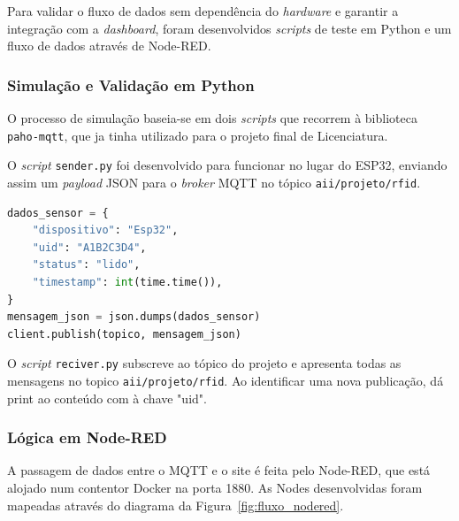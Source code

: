 \documentclass[a4paper,12pt]{article}
\begin{document}
Para validar o fluxo de dados sem dependência do \textit{hardware} e garantir a integração com a \textit{dashboard}, foram desenvolvidos \textit{scripts} de teste em Python e um fluxo de dados através de Node-RED.

\subsubsection{Simulação e Validação em Python}

O processo de simulação baseia-se em dois \textit{scripts} que recorrem à biblioteca \texttt{paho-mqtt}, que ja tinha utilizado para o projeto final de Licenciatura. 

O \textit{script} \texttt{sender.py} foi desenvolvido para funcionar no lugar do ESP32, enviando assim um \textit{payload} JSON para o \textit{broker} MQTT no tópico \texttt{aii/projeto/rfid}.

\begin{lstlisting}[language=Python, caption={Geração e envio de dados simulados}]
dados_sensor = {
    "dispositivo": "Esp32",
    "uid": "A1B2C3D4",
    "status": "lido",
    "timestamp": int(time.time()),
}
mensagem_json = json.dumps(dados_sensor)
client.publish(topico, mensagem_json)
\end{lstlisting}

O \textit{script} \texttt{reciver.py} subscreve ao tópico do projeto e apresenta todas as mensagens no topico \texttt{aii/projeto/rfid}. Ao identificar uma nova publicação, dá print ao conteúdo com à chave "uid".

\subsubsection{Lógica em Node-RED}

A passagem de dados entre o MQTT e o site é feita pelo Node-RED, que está alojado num contentor Docker na porta 1880. As Nodes desenvolvidas foram mapeadas através do diagrama da Figura~\ref{fig:fluxo_nodered}.
\end{document}
